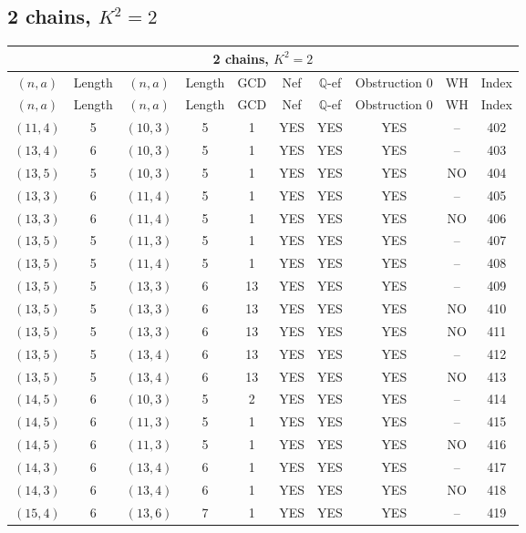 \subsection{2 chains, $K^2 = 2$}
\begin{longtable}{|c|c|c|c|c|c|c|c|c|c|}
\hline
\multicolumn{10}{|c|}{2 chains, $K^2 = 2$}\\
\hline
$(n,a)$ & Length & $(n,a)$ & Length & GCD & Nef & $\mathbb Q$-ef & Obstruction 0 & WH & Index\\
\hline
\endfirsthead

\hline
$(n,a)$ & Length & $(n,a)$ & Length & GCD & Nef & $\mathbb Q$-ef & Obstruction 0 & WH & Index\\
\hline
\endhead
\hline
\endfoot

$(11, 4)$ & 5 & $(10, 3)$ & 5 & 1 & YES & YES & YES & -- & 402\\
$(13, 4)$ & 6 & $(10, 3)$ & 5 & 1 & YES & YES & YES & -- & 403\\
$(13, 5)$ & 5 & $(10, 3)$ & 5 & 1 & YES & YES & YES & NO & 404\\
$(13, 3)$ & 6 & $(11, 4)$ & 5 & 1 & YES & YES & YES & -- & 405\\
$(13, 3)$ & 6 & $(11, 4)$ & 5 & 1 & YES & YES & YES & NO & 406\\
$(13, 5)$ & 5 & $(11, 3)$ & 5 & 1 & YES & YES & YES & -- & 407\\
$(13, 5)$ & 5 & $(11, 4)$ & 5 & 1 & YES & YES & YES & -- & 408\\
$(13, 5)$ & 5 & $(13, 3)$ & 6 & 13 & YES & YES & YES & -- & 409\\
$(13, 5)$ & 5 & $(13, 3)$ & 6 & 13 & YES & YES & YES & NO & 410\\
$(13, 5)$ & 5 & $(13, 3)$ & 6 & 13 & YES & YES & YES & NO & 411\\
$(13, 5)$ & 5 & $(13, 4)$ & 6 & 13 & YES & YES & YES & -- & 412\\
$(13, 5)$ & 5 & $(13, 4)$ & 6 & 13 & YES & YES & YES & NO & 413\\
$(14, 5)$ & 6 & $(10, 3)$ & 5 & 2 & YES & YES & YES & -- & 414\\
$(14, 5)$ & 6 & $(11, 3)$ & 5 & 1 & YES & YES & YES & -- & 415\\
$(14, 5)$ & 6 & $(11, 3)$ & 5 & 1 & YES & YES & YES & NO & 416\\
$(14, 3)$ & 6 & $(13, 4)$ & 6 & 1 & YES & YES & YES & -- & 417\\
$(14, 3)$ & 6 & $(13, 4)$ & 6 & 1 & YES & YES & YES & NO & 418\\
$(15, 4)$ & 6 & $(13, 6)$ & 7 & 1 & YES & YES & YES & -- & 419\\

\end{longtable}
